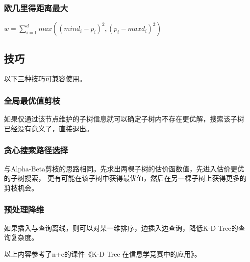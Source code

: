 \subsubsection{欧几里得距离最大}
$\displaystyle w=\sum_{i=1}^d{max((mind_i-p_i)^2,(p_i-maxd_i)^2)}$
\subsection{技巧}
以下三种技巧可兼容使用。
\subsubsection{全局最优值剪枝}
如果仅通过该节点维护的子树信息就可以确定子树内不存在更优解，搜索该子树
已经没有意义了，直接退出。
\subsubsection{贪心搜索路径选择}
与Alpha-Beta剪枝的思路相同。先求出两棵子树的估价函数值，先进入估价更优的子树搜索，
更有可能在该子树中获得最优值，然后在另一棵子树上获得更多的剪枝机会。
\subsubsection{预处理降维}
如果插入与查询离线，则可以对某一维排序，边插入边查询，降低K-D Tree的查询复杂度。

以上内容参考了n+e的课件《K-D Tree 在信息学竞赛中的应用》\cite{kdTree}。

